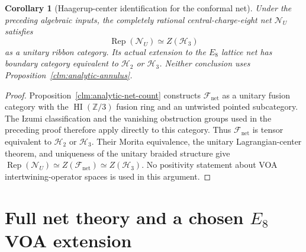 \documentclass[11pt,a4paper]{article}
\newtheorem{corollary}[theorem]{Corollary}
\theoremstyle{definition}
\DeclareMathOperator{\Rep}{Rep}
\newcommand{\HH}{\mathcal H}
\begin{document}
\begin{corollary}[Haagerup-center identification for the conformal net]
\label{cor:analytic-net-haagerup}
Under the preceding algebraic inputs, the completely rational
central-charge-eight net $\mathcal N_U$ satisfies
\[
 \Rep(\mathcal N_U)\simeq Z(\HH_3)
\]
as a unitary ribbon category.  Its actual extension to the $E_8$
lattice net has boundary category equivalent to $\HH_2$ or $\HH_3$.
Neither conclusion uses Proposition~\ref{clm:analytic-annulus}.
\end{corollary}
\begin{proof}
Proposition~\ref{clm:analytic-net-count} constructs
$\mathcal F_{\mathrm{net}}$ as a unitary fusion category with the
$\operatorname{HI}(\mathbb Z/3)$ fusion ring and an untwisted pointed
subcategory.  The Izumi classification and the vanishing obstruction
groups used in the preceding proof therefore apply directly to this
category.  Thus $\mathcal F_{\mathrm{net}}$ is tensor equivalent to
$\HH_2$ or $\HH_3$.  Their Morita equivalence, the unitary
Lagrangian-center theorem, and uniqueness of the unitary braided
structure give
$\Rep(\mathcal N_U)\simeq Z(\mathcal F_{\mathrm{net}})\simeq Z(\HH_3)$.
No positivity statement about VOA intertwining-operator spaces is
used in this argument.
\end{proof}

\section{Full net theory and a chosen \texorpdfstring{$E_8$}{E8} VOA extension}
\label{sec:analytic-full-theory}
\end{document}
